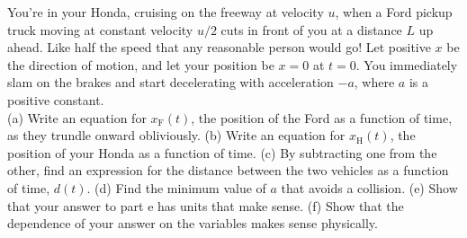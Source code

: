 You're in your Honda, cruising on the freeway at velocity $u$, when a Ford
pickup truck moving at constant velocity $u/2$ cuts in front of you at a distance $L$
up ahead. Like half the speed that any reasonable person would go!
Let positive $x$ be the direction of motion, and let your position be
$x=0$ at $t=0$.
You immediately slam on the brakes and start decelerating with
acceleration $-a$, where $a$ is a positive constant.\\
%
(a) Write an equation for
$x_\text{F}(t)$, the position of the Ford as a function of time,
as they trundle onward obliviously.\answercheck\hwendpart
%
(b) Write an equation for $x_\text{H}(t)$, the
position of your Honda as a function of time.\answercheck\hwendpart
%
(c) By subtracting one from the other, find an expression for the
distance between the two vehicles as a function of time, $d(t)$.\answercheck\hwendpart
%
(d) Find the minimum value of $a$ that avoids a collision.\answercheck\hwendpart
%
(e) Show that your answer to part e has units that make sense.\hwendpart
%
(f) Show that the dependence of your answer on the variables makes sense physically.
